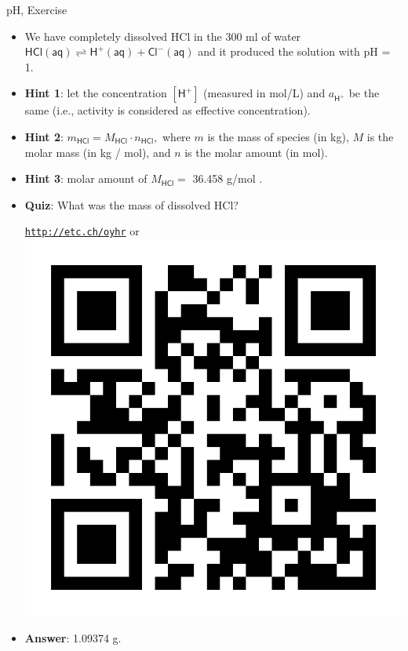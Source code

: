\begin{frame}{pH, Exercise}
	\small
	\begin{itemize}
		\item We have completely dissolved HCl in the 300 ml of water  
		$\mathsf{HCl(aq) \rightleftharpoons H^+(aq) + Cl^-(aq)}$
		 and it produced the solution with pH = 1. 
		\pause
		\item {\bf Hint 1}: let the concentration $[\mathsf{H^+}]$ (measured in mol/L) and $a_{\mathsf{H^+}}$ be the same (i.e., activity is considered as effective concentration). 
		\item {\bf Hint 2}: $m_{\mathsf{HCl}} = M_{\mathsf{HCl}}  \cdot n_{\mathsf{HCl}},$ 
		where $m$ is the mass of species (in kg), 
		$M$ is the molar mass (in kg / mol), and 
		$n$ is the molar amount (in mol). 
		\item {\bf Hint 3}: molar amount of $M_{\mathsf{HCl}} = $ 36.458 g/mol .
		\pause
		\item  \alert{\bf Quiz}: What was the mass of dissolved HCl?
		\begin{center}
			\href{http://etc.ch/oyhr}{\textcolor{indigo(dye)}{\tt http://etc.ch/oyhr}} 
			\quad
			or 
			\quad
			\includegraphics[height=0.2\columnwidth]{figures/chemical-equilibrium/poll-mass-balance.png}
		\end{center}
		\hiddenpause
		\item {\bf Answer}: 1.09374 g. 
	\end{itemize}
	
\end{frame}
%
